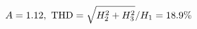 \documentclass[preview]{standalone}
\begin{document}
\begin{align*}
\special{dvisvgm:raw <g id='unique000'>}A=1.12,\ \text{THD}=\sqrt{H_2^2+H_3^2}/H_1=18.9\%\special{dvisvgm:raw </g>}
\end{align*}
\end{document}
